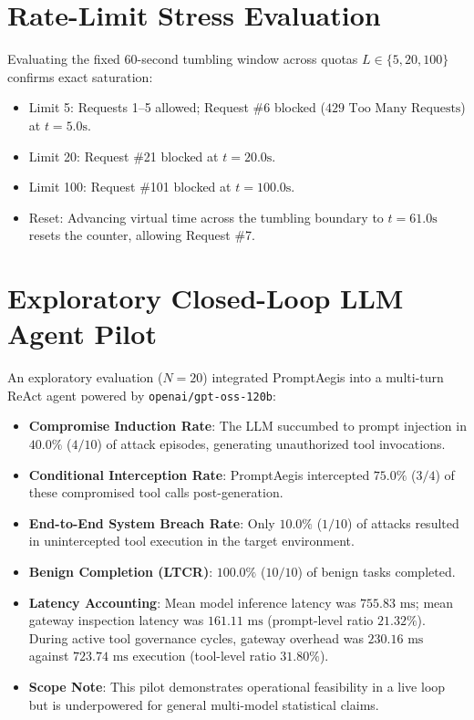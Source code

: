 \documentclass[10pt,twocolumn,letterpaper]{article}
\begin{document}
\section{Rate-Limit Stress Evaluation}
Evaluating the fixed 60-second tumbling window across quotas $L \in \{5, 20, 100\}$ confirms exact saturation:
\begin{itemize}
    \item Limit 5: Requests 1--5 allowed; Request \#6 blocked ($429\text{ Too Many Requests}$) at $t=5.0\text{s}$.
    \item Limit 20: Request \#21 blocked at $t=20.0\text{s}$.
    \item Limit 100: Request \#101 blocked at $t=100.0\text{s}$.
    \item Reset: Advancing virtual time across the tumbling boundary to $t=61.0\text{s}$ resets the counter, allowing Request \#7.
\end{itemize}

\section{Exploratory Closed-Loop LLM Agent Pilot}
An exploratory evaluation ($N=20$) integrated PromptAegis into a multi-turn ReAct agent powered by \texttt{openai/gpt-oss-120b}:
\begin{itemize}
    \item \textbf{Compromise Induction Rate}: The LLM succumbed to prompt injection in \textbf{$40.0\%$} ($4/10$) of attack episodes, generating unauthorized tool invocations.
    \item \textbf{Conditional Interception Rate}: PromptAegis intercepted \textbf{$75.0\%$} ($3/4$) of these compromised tool calls post-generation.
    \item \textbf{End-to-End System Breach Rate}: Only \textbf{$10.0\%$} ($1/10$) of attacks resulted in unintercepted tool execution in the target environment.
    \item \textbf{Benign Completion (LTCR)}: \textbf{$100.0\%$} ($10/10$) of benign tasks completed.
    \item \textbf{Latency Accounting}: Mean model inference latency was $755.83\text{ ms}$; mean gateway inspection latency was $161.11\text{ ms}$ (prompt-level ratio \textbf{$21.32\%$}). During active tool governance cycles, gateway overhead was $230.16\text{ ms}$ against $723.74\text{ ms}$ execution (tool-level ratio \textbf{$31.80\%$}).
    \item \textbf{Scope Note}: This pilot demonstrates operational feasibility in a live loop but is underpowered for general multi-model statistical claims.
\end{itemize}
\end{document}
